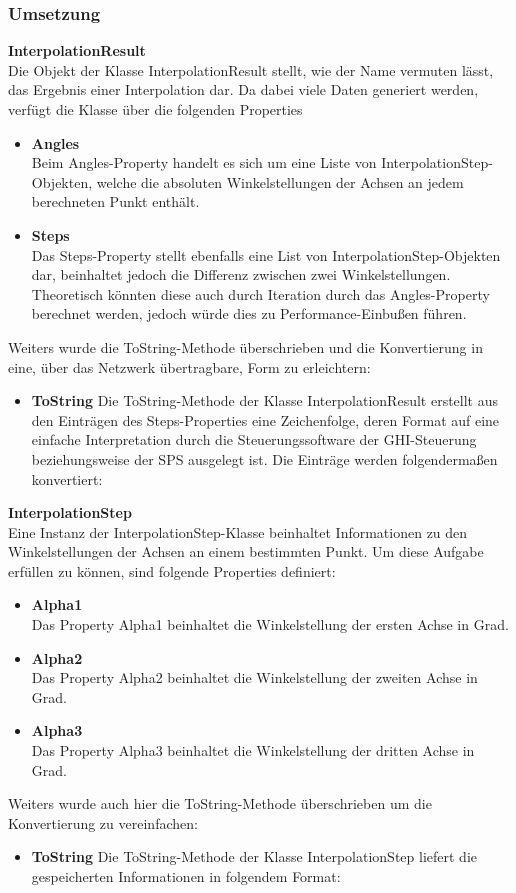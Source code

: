 \subsubsection{Umsetzung}
\textbf{InterpolationResult}\\
Die Objekt der Klasse InterpolationResult stellt, wie der Name vermuten lässt, das Ergebnis einer Interpolation dar. Da dabei viele Daten generiert werden, verfügt die Klasse über die folgenden Properties
\begin{itemize}
\item \textbf{Angles}\\
Beim Angles-Property handelt es sich um eine Liste von InterpolationStep-Objekten, welche die absoluten Winkelstellungen der Achsen an jedem berechneten Punkt enthält. 
\item \textbf{Steps}\\
Das Steps-Property stellt ebenfalls eine List von InterpolationStep-Objekten dar, beinhaltet jedoch die Differenz zwischen zwei Winkelstellungen. Theoretisch könnten diese auch durch Iteration durch das Angles-Property berechnet werden, jedoch würde dies zu Performance-Einbußen führen. 
\end{itemize}
Weiters wurde die ToString-Methode überschrieben und die Konvertierung in eine, über das Netzwerk übertragbare, Form zu erleichtern:
\begin{itemize}
\item \textbf{ToString}
Die ToString-Methode der Klasse InterpolationResult erstellt aus den Einträgen des Steps-Properties eine Zeichenfolge, deren Format auf eine einfache Interpretation durch die Steuerungssoftware der GHI-Steuerung beziehungsweise der SPS ausgelegt ist. Die Einträge werden folgendermaßen konvertiert:\\
\end{itemize}
\textbf{InterpolationStep}\\
Eine Instanz der InterpolationStep-Klasse beinhaltet Informationen zu den Winkelstellungen der Achsen an einem bestimmten Punkt. Um diese Aufgabe erfüllen zu können, sind folgende Properties definiert:
\begin{itemize}
\item \textbf{Alpha1}\\
Das Property Alpha1 beinhaltet die Winkelstellung der ersten Achse in Grad.
\item \textbf{Alpha2}\\
Das Property Alpha2 beinhaltet die Winkelstellung der zweiten Achse in Grad.
\item \textbf{Alpha3}\\
Das Property Alpha3 beinhaltet die Winkelstellung der dritten Achse in Grad.
\end{itemize} 
Weiters wurde auch hier die ToString-Methode überschrieben um die Konvertierung zu vereinfachen:
\begin{itemize}
\item \textbf{ToString}
Die ToString-Methode der Klasse InterpolationStep liefert die gespeicherten Informationen in folgendem Format:\\
\end{itemize}


